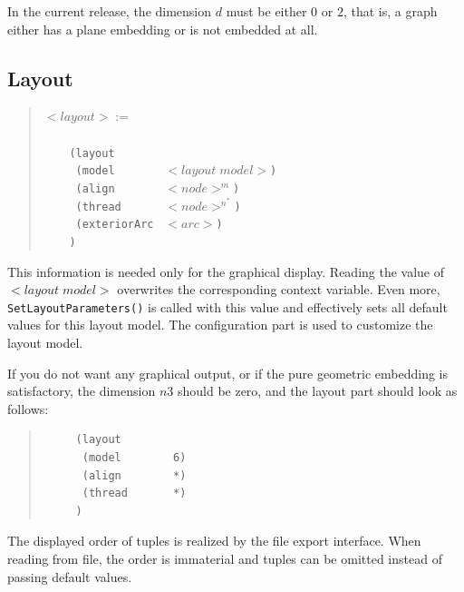 \documentclass[a4paper,11pt,twoside]{book}
\begin{document}
\begin{multicols}{2}
In the current release, the dimension $d$ must be either $0$ or $2$, that is,
a graph either has a plane embedding or is not embedded at all.


\subsection{Layout}
\begin{quote}
$<layout> :=$\verb/    /\\
\verb/    /\\
\verb/    (layout/\\
\verb/     (model       / $<layout\;model>$\verb/)/\\
\verb/     (align       / $<node>^m$\verb/)/\\
\verb/     (thread      / $<node>^{n^*}$\verb/)/\\
\verb/     (exteriorArc / $<arc>$\verb/)/\\
\verb/    )/\\
\end{quote}
This information is needed only for the graphical display.
Reading the value of $<layout\;model>$ overwrites the corresponding context
variable. Even more, \verb/SetLayoutParameters()/ is called with this value
and effectively sets all default values for this layout model. The
configuration part is used to customize the layout model. 

If you do not want any graphical output, or if the pure geometric embedding
is satisfactory, the dimension $n3$ should be zero, and the layout part should
look as follows:
\begin{quote}
\begin{verbatim}
     (layout
      (model        6)
      (align        *)
      (thread       *)
     )
\end{verbatim}
\end{quote}
The displayed order of tuples is realized by the file export interface.
When reading from file, the order is immaterial and tuples can be omitted
instead of passing default values.



\end{multicols}
\end{document}
